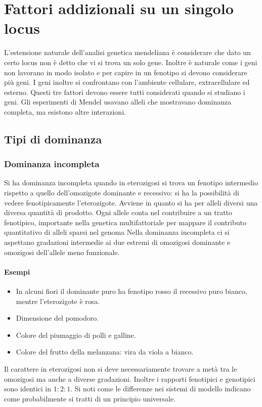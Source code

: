 \section{Fattori addizionali su un singolo locus}
L'estensione naturale dell'analisi genetica mendeliana \`e considerare che dato un certo locus non \`e detto che vi si trova un solo gene. Inoltre \`e naturale come i geni non 
lavorano in modo isolato e per capire in un fenotipo si devono considerare pi\`u geni. I geni inoltre si confrontano con l'ambiente cellulare, extracellulare ed esterno. Questi tre
fattori devono essere tutti considerati quando si studiano i geni. Gli esperimenti di Mendel usavano alleli che mostravano dominanza completa, ma esistono altre interazioni.
\subsection{Tipi di dominanza}
\subsubsection{Dominanza incompleta}
Si ha dominanza incompleta quando in eterozigosi si trova un fenotipo intermedio rispetto a quello dell'omozigote dominante e recessivo: si ha la possibilit\`a di vedere fenotipicamente l'eterozigote.  
Avviene in quanto si ha per alleli diversi una diversa quantit\`a di prodotto. Ogni allele conta nel contribuire a un tratto fenotipico, importante nella genetica multifattoriale per mappare il contributo
quantitativo di alleli sparsi nel genoma  Nella dominanza incompleta ci si aspettano gradazioni intermedie ai due estremi di omozigosi dominante e omozigosi dell'allele meno funzionale. 
\paragraph{Esempi}
\begin{itemize}
	\item In alcuni fiori il dominante puro ha fenotipo rosso il recessivo puro bianco, mentre l'eterozigote \`e rosa.
	\item Dimensione del pomodoro.
	\item Colore del piumaggio di polli e galline.
	\item Colore del frutto della melanzana: vira da viola a bianco.
\end{itemize}
Il carattere in eterozigosi non si deve necessariamente trovare a met\`a tra le omozigosi ma anche a diverse gradazioni. Inoltre i rapporti fenotipici e genotipici sono identici in $1:2:1$. 
Si noti come le differenze nei sistemi di modello indicano come probabilmente si tratti di un principio universale. 

